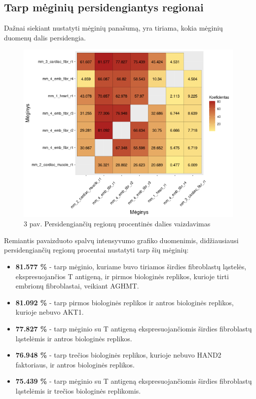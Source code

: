 \documentclass[12pt]{article}
\begin{document}
\newpage

\subsection{Tarp mėginių persidengiantys regionai}
Dažnai siekiant nustatyti mėginių panašumą, yra tiriama, kokia
mėginių duomenų dalis persidengia.

\begin{figure}[htb]
    \begin{center}
        \includegraphics[width=0.8\linewidth]{Figures/peak_overlaps_between_samples.png}
        \caption*{3 pav. Persidengiančių regionų procentinės dalies vaizdavimas}
    \end{center}
\end{figure}

Remiantis pavaizduoto spalvų intensyvumo grafiko duomenimis,
didžiausiausi persidengiančių regionų procentai nustatyti tarp
šių mėginių:
\begin{itemize}
    \item \textbf{81.577 \%} - tarp mėginio, kuriame buvo tiriamos širdies
            fibroblastų ląstelės, ekspresuojančios T antigeną, ir pirmos
            biologinės replikos, kurioje tirti embrionų fibroblastai,
            veikiant AGHMT.
    \item \textbf{81.092 \%} - tarp pirmos biologinės replikos ir antros
            biologinės replikos, kurioje nebuvo AKT1.
    \item \textbf{77.827 \%} - tarp mėginio su T antigeną ekspresuojančiomis
            širdies fibroblastų ląstelėmis ir antros biologinės replikos.
    \item \textbf{76.948 \%} - tarp trečios biologinės replikos, kurioje
            nebuvo HAND2 faktoriaus, ir antros biologinės replikos.
    \item \textbf{75.439 \%} - tarp mėginio su T antigeną ekspresuojančiomis
            širdies fibroblastų ląstelėmis ir trečios biologinės replikomis.
  \end{itemize}
\end{document}
